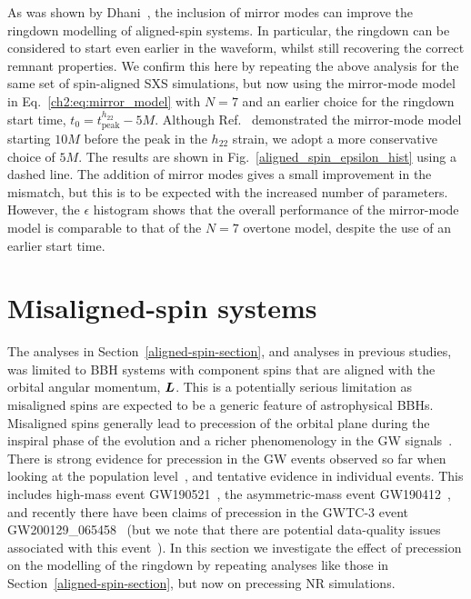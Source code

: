 As was shown by Dhani~\cite{Dhani:2020nik}, the inclusion of mirror modes can improve the ringdown modelling of aligned-spin systems. In particular, the ringdown can be considered to start even earlier in the waveform, whilst still recovering the correct remnant properties. We confirm this here by repeating the above analysis for the same set of spin-aligned SXS simulations, but now using the mirror-mode model in Eq.~\ref{ch2:eq:mirror_model} with $N=7$ and an earlier choice for the ringdown start time, $t_0 = t_{\mathrm{peak}}^{h_{22}} - 5M$.
Although Ref.~\cite{Dhani:2020nik} demonstrated the mirror-mode model starting $10M$ before the peak in the $h_{22}$ strain, we adopt a more conservative choice of $5M$.
The results are shown in Fig.~\ref{aligned_spin_epsilon_hist} using a dashed line. 
The addition of mirror modes gives a small improvement in the mismatch, but this is to be expected with the increased number of parameters.
However, the $\epsilon$ histogram shows that the overall performance of the mirror-mode model is comparable to that of the $N=7$ overtone model, despite the use of an earlier start time.


\section{Misaligned-spin systems}\label{misaligned-spin-section}

The analyses in Section~\ref{aligned-spin-section}, and analyses in previous studies,
was limited to BBH systems with component spins that are aligned with the orbital angular momentum, $\vb*{L}$.
This is a potentially serious limitation as misaligned spins are expected to be a generic feature of astrophysical BBHs.
Misaligned spins generally lead to precession of the orbital plane during the inspiral phase of the evolution and a richer phenomenology in the GW signals~\cite{Apostolatos:1994mx}.
There is strong evidence for precession in the GW events observed so far when looking at the population level~\cite{LIGOScientific:2020kqk, LIGOScientific:2021psn}, and tentative evidence in individual events. 
This includes high-mass event GW190521~\cite{LIGOScientific:2020iuh, LIGOScientific:2020ufj}, the asymmetric-mass event GW190412~\cite{LIGOScientific:2020stg}, and recently there have been claims of precession in the GWTC-3 event GW200129\_065458~\cite{Hannam:2021pit} (but we note that there are potential data-quality issues associated with this event~\cite{Payne:2022spz}).
In this section we investigate the effect of precession on the modelling of the ringdown by repeating analyses like those in Section~\ref{aligned-spin-section}, but now on precessing NR simulations.


